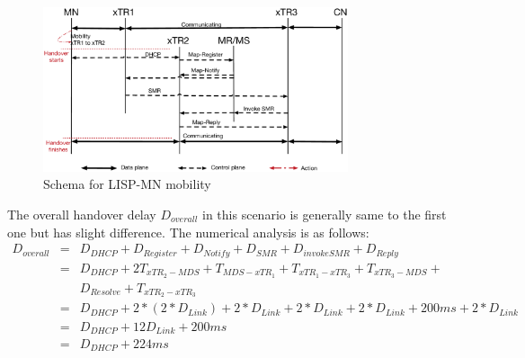 \begin{figure}[!th]
	\centering
	\includegraphics[width=0.8\textwidth]{Pics/Mobility_xTR_schema_SMR_simplify}
	\caption{Schema for LISP-MN mobility}
	\label{sim_schema_xTR}
\end{figure}

The overall handover delay $D_{overall}$ in this scenario is generally same to the first one but has slight difference. The numerical analysis is as follows:
\begin{eqnarray}
D_{overall} &=& D_{DHCP} + D_{Register} + D_{Notify} + D_{SMR} + D_{invokeSMR} + D_{Reply} \nonumber \\
&=& D_{DHCP} + 2T_{xTR_2-MDS} + T_{MDS-xTR_1} + T_{xTR_1-xTR_3} + T_{xTR_3-MDS} + \nonumber \\
& & D_{Resolve} + T_{xTR_2-xTR_3} \nonumber \\
&=& D_{DHCP} +2* (2*D_{Link}) + 2*D_{Link} + 2*D_{Link} + 2*D_{Link} + 200ms + 2*D_{Link} \nonumber \\
&=& D_{DHCP} + 12D_{Link} + 200 ms  \\
&=& D_{DHCP} + 224 ms \nonumber
\end{eqnarray}

